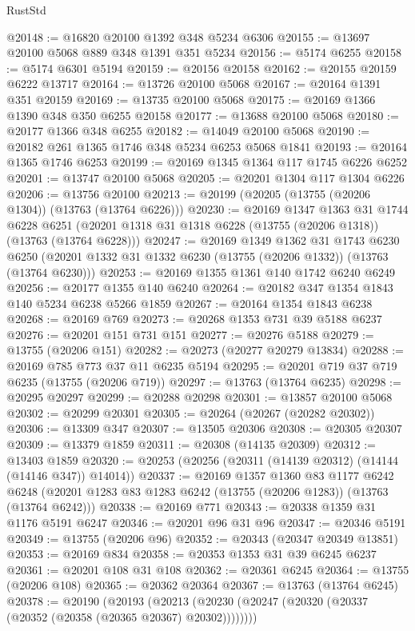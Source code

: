 \begin{lexlean}{RustStd}
\begin{coremodule}
@20148 := @16820 @20100 @1392 @348 @5234 @6306
@20155 := @13697 @20100 @5068 @889 @348 @1391 @351 @5234
@20156 := @5174 @6255
@20158 := @5174 @6301 @5194
@20159 := @20156 @20158
@20162 := @20155 @20159 @6222 @13717
@20164 := @13726 @20100 @5068
@20167 := @20164 @1391 @351 @20159
@20169 := @13735 @20100 @5068
@20175 := @20169 @1366 @1390 @348 @350 @6255 @20158
@20177 := @13688 @20100 @5068
@20180 := @20177 @1366 @348 @6255
@20182 := @14049 @20100 @5068
@20190 := @20182 @261 @1365 @1746 @348 @5234 @6253 @5068 @1841
@20193 := @20164 @1365 @1746 @6253
@20199 := @20169 @1345 @1364 @117 @1745 @6226 @6252
@20201 := @13747 @20100 @5068
@20205 := @20201 @1304 @117 @1304 @6226
@20206 := @13756 @20100
@20213 := @20199 (@20205 (@13755 (@20206 @1304)) (@13763 (@13764 @6226)))
@20230 := @20169
    @1347
    @1363
    @31
    @1744
    @6228
    @6251
    (@20201 @1318 @31 @1318 @6228 (@13755 (@20206 @1318)) (@13763 (@13764 @6228)))
@20247 := @20169
    @1349
    @1362
    @31
    @1743
    @6230
    @6250
    (@20201 @1332 @31 @1332 @6230 (@13755 (@20206 @1332)) (@13763 (@13764 @6230)))
@20253 := @20169 @1355 @1361 @140 @1742 @6240 @6249
@20256 := @20177 @1355 @140 @6240
@20264 := @20182 @347 @1354 @1843 @140 @5234 @6238 @5266 @1859
@20267 := @20164 @1354 @1843 @6238
@20268 := @20169 @769
@20273 := @20268 @1353 @731 @39 @5188 @6237
@20276 := @20201 @151 @731 @151
@20277 := @20276 @5188
@20279 := @13755 (@20206 @151)
@20282 := @20273 (@20277 @20279 @13834)
@20288 := @20169 @785 @773 @37 @11 @6235 @5194
@20295 := @20201 @719 @37 @719 @6235 (@13755 (@20206 @719))
@20297 := @13763 (@13764 @6235)
@20298 := @20295 @20297
@20299 := @20288 @20298
@20301 := @13857 @20100 @5068
@20302 := @20299 @20301
@20305 := @20264 (@20267 (@20282 @20302))
@20306 := @13309 @347
@20307 := @13505 @20306
@20308 := @20305 @20307
@20309 := @13379 @1859
@20311 := @20308 (@14135 @20309)
@20312 := @13403 @1859
@20320 := @20253 (@20256 (@20311 (@14139 @20312) (@14144 (@14146 @347)) @14014))
@20337 := @20169
    @1357
    @1360
    @83
    @1177
    @6242
    @6248
    (@20201 @1283 @83 @1283 @6242 (@13755 (@20206 @1283)) (@13763 (@13764 @6242)))
@20338 := @20169 @771
@20343 := @20338 @1359 @31 @1176 @5191 @6247
@20346 := @20201 @96 @31 @96
@20347 := @20346 @5191
@20349 := @13755 (@20206 @96)
@20352 := @20343 (@20347 @20349 @13851)
@20353 := @20169 @834
@20358 := @20353 @1353 @31 @39 @6245 @6237
@20361 := @20201 @108 @31 @108
@20362 := @20361 @6245
@20364 := @13755 (@20206 @108)
@20365 := @20362 @20364
@20367 := @13763 (@13764 @6245)
@20378 := @20190
    (@20193 (@20213 (@20230 (@20247 (@20320 (@20337 (@20352 (@20358 (@20365 @20367) @20302))))))))

\end{coremodule}
\end{lexlean}
